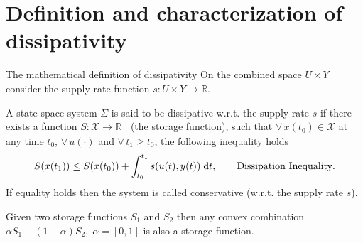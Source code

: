 \documentclass[aspectratio=169]{beamer}
\newcommand{\bbR}{\mathbb{R}}
\begin{document}
\section{Definition and characterization of dissipativity}

\begin{frame}{The mathematical definition of dissipativity}
On the combined space $U × Y$ consider the supply rate function $s : U \times Y \rightarrow \bbR$.

\begin{definition}
A state space system $\Sigma$ is said to be dissipative w.r.t. the supply rate $s$ if there exists a function $S : \mathcal{X} \rightarrow \bbR_+$ (the storage function), such
that $\forall \, x(t_0) \in \mathcal{X}$ at any time $t_0$, $\forall\,  u(\cdot)$ and $\forall\, t_1 \ge t_0$, the following inequality holds
\begin{equation}\label{eq:diss_ineq}
	S(x(t_1)) \le S(x(t_0)) + \int_{t_0}^{t_1} s(u(t), y(t)) \d t, \qquad \text{Dissipation Inequality}.
\end{equation}
If equality holds then the system is called conservative (w.r.t. the supply rate $s$). 
\end{definition}
\begin{corollary}
	Given two storage functions $S_1$ and $S_2$ then any convex combination $\alpha S_1 + (1-\alpha) S_2, \; \alpha=[0,1]$ is also a storage function.
\end{corollary}

\end{frame}
\end{document}
